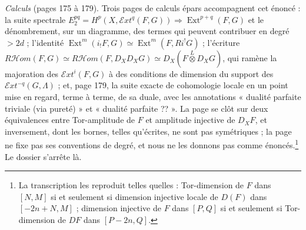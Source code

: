 \documentclass[11pt,a4paper]{article}
\begin{document}
\emph{Calculs} (pages 175 à 179). Trois pages de calculs épars accompagnent
cet énoncé : la suite spectrale $E_{2}^{pq} = H^{p}(X, \mathcal{E}xt^{q}(F, G))
\Rightarrow \operatorname{Ext}^{p+q}(F, G)$ et le dénombrement, sur un
diagramme, des termes qui peuvent contribuer en degré $> 2d$ ; l'identité
$\operatorname{Ext}^{m}(i_{!}F, G) \simeq \operatorname{Ext}^{m}(F, Ri^{!}G)$ ;
l'écriture $R\mathcal{H}om(F, G) \simeq R\mathcal{H}om(F, D_{X}D_{X}G) \simeq
D_{X}(F \overset{L}{\otimes} D_{X}G)$, qui ramène la majoration des
$\mathcal{E}xt^{i}(F, G)$ à des conditions de dimension du support des
$\mathcal{E}xt^{-q}(G, \Lambda)$ ; et, page 179, la suite exacte de
cohomologie locale en un point mise en regard, terme à terme, de sa duale, avec
les annotations « dualité parfaite triviale (via pureté) » et « dualité
parfaite ?? ». La page se clôt sur deux équivalences entre Tor-amplitude de $F$
et amplitude injective de $D_{X}F$, et inversement, dont les bornes, telles
qu'écrites, ne sont pas symétriques ; la page ne fixe pas ses conventions de
degré, et nous ne les donnons pas comme énoncés.\footnote{La transcription les
reproduit telles quelles : Tor-dimension de $F$ dans $[N, M]$ si et seulement si
dimension injective locale de $D(F)$ dans $[-2n+N, M]$ ; dimension injective
de $F$ dans $[P, Q]$ si et seulement si Tor-dimension de $DF$ dans $[P - 2n,
Q]$.} Le dossier s'arrête là.
\end{document}
